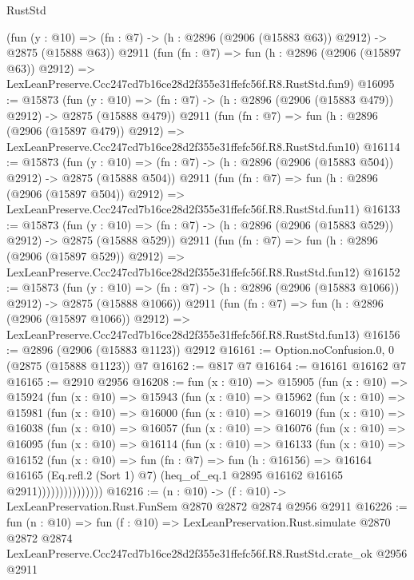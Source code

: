 \begin{lexlean}{RustStd}
\begin{coremodule}
    (fun (y : @10) => (fn : @7) -> (h : @2896 (@2906 (@15883 @63)) @2912) -> @2875 (@15888 @63))
    @2911
    (fun (fn : @7) =>
    fun (h : @2896 (@2906 (@15897 @63)) @2912) =>
    LexLeanPreserve.Ccc247cd7b16ce28d2f355e31ffefc56f.R8.RustStd.fun9)
@16095 := @15873
    (fun (y : @10) => (fn : @7) -> (h : @2896 (@2906 (@15883 @479)) @2912) -> @2875 (@15888 @479))
    @2911
    (fun (fn : @7) =>
    fun (h : @2896 (@2906 (@15897 @479)) @2912) =>
    LexLeanPreserve.Ccc247cd7b16ce28d2f355e31ffefc56f.R8.RustStd.fun10)
@16114 := @15873
    (fun (y : @10) => (fn : @7) -> (h : @2896 (@2906 (@15883 @504)) @2912) -> @2875 (@15888 @504))
    @2911
    (fun (fn : @7) =>
    fun (h : @2896 (@2906 (@15897 @504)) @2912) =>
    LexLeanPreserve.Ccc247cd7b16ce28d2f355e31ffefc56f.R8.RustStd.fun11)
@16133 := @15873
    (fun (y : @10) => (fn : @7) -> (h : @2896 (@2906 (@15883 @529)) @2912) -> @2875 (@15888 @529))
    @2911
    (fun (fn : @7) =>
    fun (h : @2896 (@2906 (@15897 @529)) @2912) =>
    LexLeanPreserve.Ccc247cd7b16ce28d2f355e31ffefc56f.R8.RustStd.fun12)
@16152 := @15873
    (fun (y : @10) => (fn : @7) -> (h : @2896 (@2906 (@15883 @1066)) @2912) -> @2875 (@15888 @1066))
    @2911
    (fun (fn : @7) =>
    fun (h : @2896 (@2906 (@15897 @1066)) @2912) =>
    LexLeanPreserve.Ccc247cd7b16ce28d2f355e31ffefc56f.R8.RustStd.fun13)
@16156 := @2896 (@2906 (@15883 @1123)) @2912
@16161 := Option.noConfusion.{0, 0} (@2875 (@15888 @1123)) @7
@16162 := @817 @7
@16164 := @16161 @16162 @7
@16165 := @2910 @2956
@16208 := fun (x : @10) =>
  @15905
    (fun (x : @10) =>
    @15924
      (fun (x : @10) =>
      @15943
        (fun (x : @10) =>
        @15962
          (fun (x : @10) =>
          @15981
            (fun (x : @10) =>
            @16000
              (fun (x : @10) =>
              @16019
                (fun (x : @10) =>
                @16038
                  (fun (x : @10) =>
                  @16057
                    (fun (x : @10) =>
                    @16076
                      (fun (x : @10) =>
                      @16095
                        (fun (x : @10) =>
                        @16114
                          (fun (x : @10) =>
                          @16133
                            (fun (x : @10) =>
                            @16152
                              (fun (x : @10) =>
                              fun (fn : @7) =>
                              fun (h : @16156) =>
                              @16164
                                @16165
                                (Eq.refl.{2} (Sort 1) @7)
                                (heq_of_eq.{1} @2895 @16162 @16165 @2911)))))))))))))))
@16216 := (n : @10) -> (f : @10) -> LexLeanPreservation.Rust.FunSem @2870 @2872 @2874 @2956 @2911
@16226 := fun (n : @10) =>
  fun (f : @10) =>
  LexLeanPreservation.Rust.simulate
    @2870
    @2872
    @2874
    LexLeanPreserve.Ccc247cd7b16ce28d2f355e31ffefc56f.R8.RustStd.crate_ok
    @2956
    @2911
\end{coremodule}
\end{lexlean}
